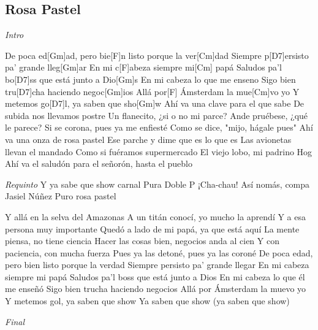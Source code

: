 \subsection{Rosa Pastel}
\noindent

\vspace{1cm}

\begin{guitar}
	\begin{multicols}{2}

		\textit{Intro}

		De poca ed[Gm]ad, pero bie[F]n listo porque la ver[Cm]dad
		Siempre p[D7]ersisto pa' grande lleg[Gm]ar
		En mi c[F]abeza siempre mi[Cm] papá
		Saludos pa'l bo[D7]ss que está junto a Dio[Gm]s
		En mi cabeza lo que me enseno
		Sigo bien tru[D7]cha haciendo negoc[Gm]ios
		Allá por[F] Ámsterdam la mue[Cm]vo yo
		Y metemos go[D7]l, ya saben que sho[Gm]w
	Ahí va una clave para el que sabe
	De subida nos llevamos postre
	Un flanecito, ¿si o no mi parce?
	Ande pruébese, ¿qué le parece?
	Si se corona, pues ya me enfiesté
	Como se dice, "mijo, hágale pues"
	Ahí va una onza de rosa pastel
	Ese parche y dime que es lo que es
	Las avionetas llevan el mandado
	Como si fuéramos supermercado
	El viejo lobo, mi padrino Hog
	Ahí va el saludón para el señorón, hasta el pueblo

	\par
	\textit{Requinto}
	Y ya sabe que show carnal
	Pura Doble P
	¡Cha-chau!
	Así nomás, compa Jasiel Núñez
	Puro rosa pastel

	\par
	Y allá en la selva del Amazonas
	A un titán conocí, yo mucho la aprendí
	Y a esa persona muy importante
	Quedó a lado de mi papá, ya que está aquí
	La mente piensa, no tiene ciencia
	Hacer las cosas bien, negocios anda al cien
	Y con paciencia, con mucha fuerza
	Pues ya las detoné, pues ya las coroné
	De poca edad, pero bien listo porque la verdad
	Siempre persisto pa' grande llegar
	En mi cabeza siempre mi papá
	Saludos pa'l boss que está junto a Dios
	En mi cabeza lo que él me enseñó
	Sigo bien trucha haciendo negocios
	Allá por Ámsterdam la muevo yo
	Y metemos gol, ya saben que show
	Ya saben que show (ya saben que show)

	\textit{Final}

	\end{multicols}
\end{guitar}
